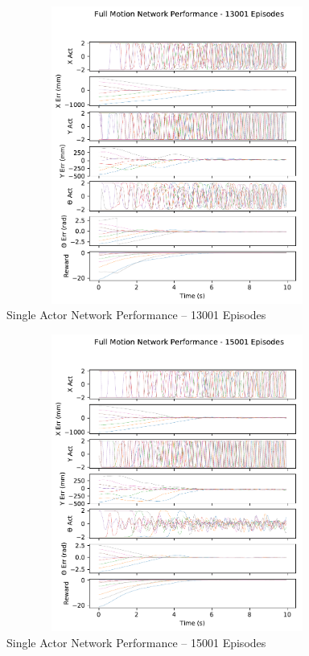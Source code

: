 \begin{figure}[H]
	\centering
	\includegraphics[width=6in, height=3.85in, keepaspectratio]{figures/train_figs/all_transitions/3_13001.pdf}
	\caption{Single Actor Network Performance -- 13001 Episodes}
\end{figure}
\begin{figure}[H]
	\centering
	\includegraphics[width=6in, height=3.85in, keepaspectratio]{figures/train_figs/all_transitions/3_15001.pdf}
	\caption{Single Actor Network Performance -- 15001 Episodes}
\end{figure}
